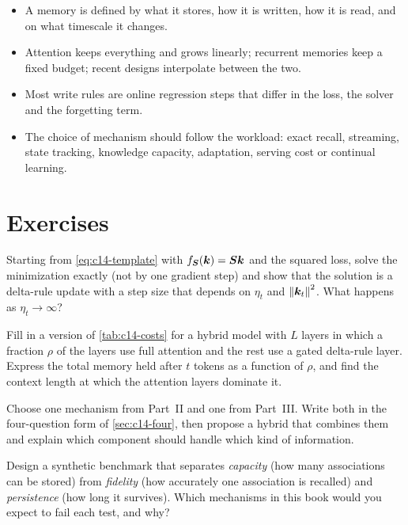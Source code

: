 \begin{summarybox}
\begin{itemize}
  \item A memory is defined by what it stores, how it is written, how it is read, and on what
    timescale it changes.
  \item Attention keeps everything and grows linearly; recurrent memories keep a fixed
    budget; recent designs interpolate between the two.
  \item Most write rules are online regression steps that differ in the loss, the solver and
    the forgetting term.
  \item The choice of mechanism should follow the workload: exact recall, streaming, state
    tracking, knowledge capacity, adaptation, serving cost or continual learning.
\end{itemize}
\end{summarybox}

\section*{Exercises}

\begin{exercise}
Starting from \eqref{eq:c14-template} with $f_{\bm{S}}(\bm{k})=\bm{S}\bm{k}$ and the squared loss, solve
the minimization exactly (not by one gradient step) and show that the solution is a delta-rule
update with a step size that depends on $\eta_t$ and $\left\lVert \bm{k}_t\right\rVert^2$. What happens as
$\eta_t\to\infty$?
\end{exercise}

\begin{exercise}
Fill in a version of \cref{tab:c14-costs} for a hybrid model with $L$ layers in which a
fraction $\rho$ of the layers use full attention and the rest use a gated delta-rule layer.
Express the total memory held after $t$ tokens as a function of $\rho$, and find the context
length at which the attention layers dominate it.
\end{exercise}

\begin{exercise}
Choose one mechanism from Part~II and one from Part~III. Write both in the four-question form
of \cref{sec:c14-four}, then propose a hybrid that combines them and explain which component
should handle which kind of information.
\end{exercise}

\begin{exercise}
Design a synthetic benchmark that separates \emph{capacity} (how many associations can be
stored) from \emph{fidelity} (how accurately one association is recalled) and
\emph{persistence} (how long it survives). Which mechanisms in this book would you expect to
fail each test, and why?
\end{exercise}
